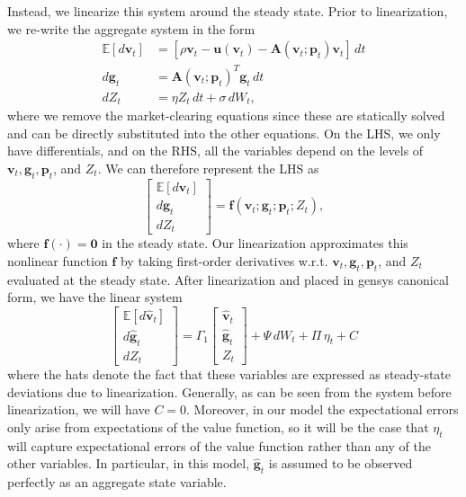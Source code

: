 \documentclass[12 pt, oneside]{article}
\theoremstyle{definition}
\theoremstyle{definition}
\theoremstyle{definition}
\newcommand{\bff}{\mathbf{f}}
\newcommand{\bfg}{\mathbf{g}}
\newcommand{\bfp}{\mathbf{p}}
\newcommand{\bfu}{\mathbf{u}}
\newcommand{\bfv}{\mathbf{v}}
\newcommand{\bfA}{\mathbf{A}}
\newcommand{\bfzero}{\mathbf{0}}
\newcommand{\E}{\mathbb{E}}
\begin{document}
Instead, we linearize this system around the steady state. Prior to linearization, we re-write the aggregate system in the form
\begin{align*}
\E[d\bfv_t] & = \left[\rho \bfv_t -\bfu(\bfv_t)- \bfA(\bfv_t;\bfp_t)\bfv_t\right]\, dt\\
d\bfg_t & = \bfA(\bfv_t;\bfp_t)^T\bfg_t\, dt\\
dZ_t & = \eta Z_t\,dt + \sigma\, dW_t,
\end{align*}
where we remove the market-clearing equations since these are statically solved and can be directly substituted into the other equations. On the LHS, we only have differentials, and on the RHS, all the variables depend on the levels of $\bfv_t, \bfg_t, \bfp_t$, and $Z_t$. We can therefore represent the LHS as
\begin{equation}
  \begin{bmatrix}
    \E[d\bfv_t]\\d\bfg_t\\dZ_t
  \end{bmatrix} = \bff(\bfv_t;\bfg_t;\bfp_t;Z_t),
\end{equation}
where $\bff(\cdot) = \bfzero$ in the steady state. Our linearization approximates this nonlinear function $\bff$ by taking first-order derivatives w.r.t. $\bfv_t, \bfg_t, \bfp_t$, and $Z_t$ evaluated at the steady state. After linearization and placed in gensys canonical form, we have the linear system
\begin{equation}\label{linearized system}
  \begin{bmatrix}
    \E[d\hat{\bfv}_t]\\d\hat{\bfg}_t\\dZ_t
  \end{bmatrix} = \Gamma_1
  \begin{bmatrix}
    \hat{\bfv}_t\\\hat{\bfg}_t\\ Z_t
  \end{bmatrix} + \Psi\, dW_t + \Pi\, \eta_t + C
\end{equation}
where the hats denote the fact that these variables are expressed as steady-state deviations due to linearization. Generally, as can be seen from the system before linearization, we will have $C = 0$. Moreover, in our model the expectational errors only arise from expectations of the value function, so it will be the case that $\eta_t$ will capture expectational errors of the value function rather than any of the other variables. In particular, in this model, $\hat{\bfg}_t$ is assumed to be observed perfectly as an aggregate state variable.
\end{document}

